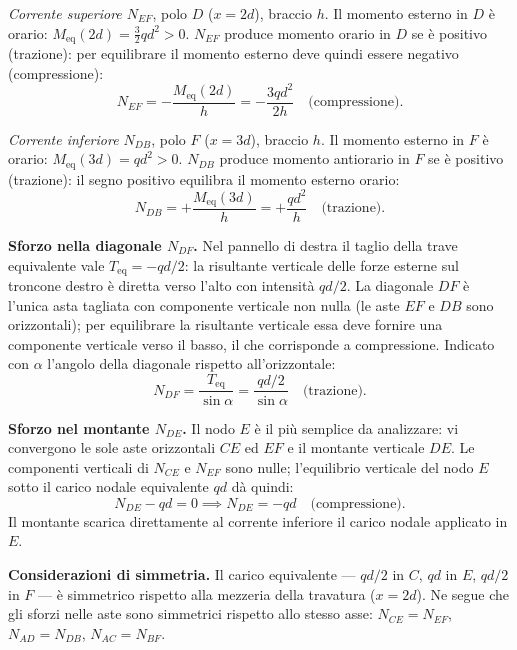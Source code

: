 \begin{esempio}
\begin{svolgimento}
		\medskip
		\noindent\textit{Corrente superiore $N_{EF}$},
		polo $D$ ($x=2d$), braccio $h$.
		Il momento esterno in $D$ è orario:
		$M_\text{eq}(2d) = \tfrac{3}{2}qd^2 > 0$.
		$N_{EF}$ produce momento orario in $D$ se è
		positivo (trazione): per equilibrare il momento
		esterno deve quindi essere negativo (compressione):
		\[
		N_{EF} = -\frac{M_\text{eq}(2d)}{h}
		= -\frac{3qd^2}{2h}
		\quad\text{(compressione)}.
		\]
		
		\noindent\textit{Corrente inferiore $N_{DB}$},
		polo $F$ ($x=3d$), braccio $h$.
		Il momento esterno in $F$ è orario:
		$M_\text{eq}(3d) = qd^2 > 0$.
		$N_{DB}$ produce momento antiorario in $F$ se è
		positivo (trazione): il segno positivo equilibra
		il momento esterno orario:
		\[
		N_{DB} = +\frac{M_\text{eq}(3d)}{h}
		= +\frac{qd^2}{h}
		\quad\text{(trazione)}.
		\]
		
		\noindent\textbf{Sforzo nella diagonale $N_{DF}$.}
		Nel pannello di destra il taglio della trave
		equivalente vale $T_\text{eq} = -qd/2$: la
		risultante verticale delle forze esterne sul
		troncone destro è diretta verso l'alto con
		intensità $qd/2$. La diagonale $DF$ è l'unica
		asta tagliata con componente verticale non nulla
		(le aste $EF$ e $DB$ sono orizzontali); per
		equilibrare la risultante verticale essa deve
		fornire una componente verticale verso il basso,
		il che corrisponde a compressione. Indicato con
		$\alpha$ l'angolo della diagonale rispetto
		all'orizzontale:
		\[
		N_{DF} = \frac{T_\text{eq}}{\sin\alpha}
		= \frac{qd/2}{\sin\alpha}
		\quad\text{(trazione)}.
		\]
		
		\noindent\textbf{Sforzo nel montante $N_{DE}$.}
		Il nodo $E$ è il più semplice da analizzare:
		vi convergono le sole aste orizzontali $CE$ ed
		$EF$ e il montante verticale $DE$. Le componenti
		verticali di $N_{CE}$ e $N_{EF}$ sono nulle;
		l'equilibrio verticale del nodo $E$ sotto il
		carico nodale equivalente $qd$ dà quindi:
		\[
		N_{DE} - qd = 0 \implies N_{DE} = -qd
		\quad\text{(compressione)}.
		\]
		Il montante scarica direttamente al corrente
		inferiore il carico nodale applicato in $E$.
		
		\medskip
		\noindent\textbf{Considerazioni di simmetria.}
		Il carico equivalente --- $qd/2$ in $C$, $qd$
		in $E$, $qd/2$ in $F$ --- è simmetrico rispetto
		alla mezzeria della travatura ($x = 2d$).
		Ne segue che gli sforzi nelle aste sono simmetrici
		rispetto allo stesso asse: $N_{CE} = N_{EF}$,
		$N_{AD} = N_{DB}$, $N_{AC} = N_{BF}$.
		

\end{svolgimento}
\end{esempio}

